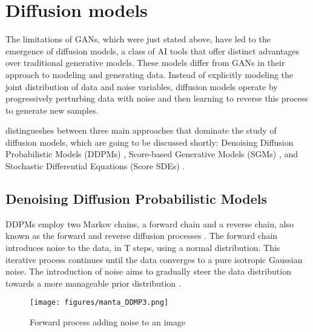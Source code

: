 \section{Diffusion models}
\label{diffusion Models}

The limitations of GANs, which were just stated above, have led to the emergence of diffusion models, a class of AI tools that offer distinct advantages over traditional generative models. These models differ from GANs in their approach to modeling and generating data.  Instead of explicitly modeling the joint distribution of data and noise variables, diffusion models operate by progressively perturbing data with noise and then learning to reverse this process to generate new samples.

\citeauthor{yangdiffusionSummary} distingueshes between three main approaches that dominate the study of diffusion models, which are going to be discussed shortly: Denoising Diffusion Probabilistic Models (DDPMs) \citep{hoDDPMs}, Score-based Generative Models (SGMs) \citep{song2019SGM}, and Stochastic Differential Equations (Score SDEs) \citep{song2020score, song2021maximum}.

\subsection{Denoising Diffusion Probabilistic Models}
DDPMs employ two Markov chains, a forward chain and a reverse chain, also known as the forward and reverse diffusion processes \citep{sohlDDPM}. The forward chain introduces noise to the data, in T steps, using a normal distribution. This iterative process continues until the data converges to a pure isotropic Gaussian noise. The introduction of noise aims to gradually steer the data distribution towards a more manageable prior distribution \citep{yangdiffusionSummary, pooleDreamfusion}. 

\begin{figure}[ht]
\centering
  \texttt{[image: figures/manta\_DDMP3.png]}
  \caption{Forward process adding noise to an image}
  \label{fig:figureDDPM}
\end{figure}

